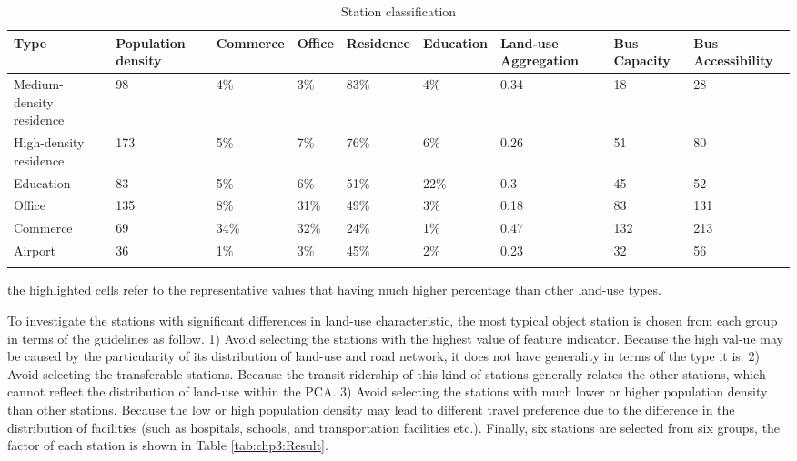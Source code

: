 \begin{sidewaystable}[htbp]
	\centering
	\caption{Station classification}
	\label{tab:chp3:StationClassification}
	\begin{tabular}{p{12em}<{\centering}p{4em}<{\centering}p{4em}<{\centering}p{4em}<{\centering}p{4em}<{\centering}p{4em}<{\centering}p{5em}<{\centering}p{5em}<{\centering}p{5em}<{\centering}}
		
		\Xhline{1.5pt}
		Type & Population density & Commerce & Office & Residence & Education & Land-use Aggregation & Bus Capacity & Bus Accessibility \\
		\midrule
		
		Medium-density residence & 98 & 4\% & 3\% & \cellcolor[rgb]{.8, .8, .8} 83\% & 4\% & 0.34 & 18 & 28 \\
		High-density residence & 173 & 5\% & 7\% & \cellcolor[rgb]{.8, .8, .8} 76\% & 6\% & 0.26 & 51 & 80 \\
		Education & 83 & 5\% & 6\% & 51\% & \cellcolor[rgb]{.8, .8, .8} 22\% & 0.3 & 45 & 52 \\
		Office & 135 & 8\% & \cellcolor[rgb]{.8, .8, .8} 31\% & 49\% & 3\% & 0.18 & 83 & 131 \\
		Commerce & 69 & \cellcolor[rgb]{.8, .8, .8} 34\% & \cellcolor[rgb]{.8, .8, .8} 32\% & 24\% & 1\% & 0.47 & 132 & 213 \\
		Airport & 36 & 1\% & 3\% & 45\% & 2\% & 0.23 & 32 & 56 \\
		\Xhline{1.5pt}
		
	\end{tabular}
	\begin{description}
		\label{note:tab:chp3:StationClassification}
		\item[*Note:] the highlighted cells refer to the representative values that having much higher percentage than other land-use types.
	\end{description}
	
\end{sidewaystable}

%
To investigate the stations with significant differences in land-use characteristic, the most typical object station is chosen from each group in terms of the guidelines as follow. 1) Avoid selecting the stations with the highest value of feature indicator. Because the high val-ue may be caused by the particularity of its distribution of land-use and road network, it does not have generality in terms of the type it is. 2) Avoid selecting the transferable stations. Because the transit ridership of this kind of stations generally relates the other stations, which cannot reflect the distribution of land-use within the PCA. 3) Avoid selecting the stations with much lower or higher population density than other stations. Because the low or high population density may lead to different travel preference due to the difference in the distribution of facilities (such as hospitals, schools, and transportation facilities etc.). Finally, six stations are selected from six groups, the factor of each station is shown in Table \ref{tab:chp3:Result}.

